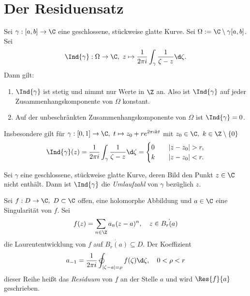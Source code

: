 \section{Der Residuensatz}\lecture
		
		\begin{thm}
			Sei $\gamma: [a,b] \to \C$ eine geschlossene, stückweise glatte Kurve. Sei $ \Omega := \C \setminus \gamma[a,b] $. Sei 
			$$ \Ind{\gamma}: \Omega \to \C,\ z \mapsto \frac{1}{2\pi i} \int_\gamma \frac{1}{\zeta- z}\d\zeta. $$
			Dann gilt:
			\begin{enumerate}[label={\alph*})]
				\item $\Ind{\gamma}$ ist stetig und nimmt nur Werte in $\Z$ an. Also ist $\Ind{\gamma}$ auf jeder Zusammenhangskomponente von $\Omega$ konstant.
				\item Auf der unbeschränkten Zusammenhangskomponente von $\Omega$ ist $\Ind{\gamma} = 0$.
			\end{enumerate}
		\end{thm}
		
		Insbesondere gilt für $ \gamma:[0,1] \to \C,\ t \mapsto z_0 + re^{2\pi ikt} $ mit $ z_0 \in \C,\ k \in \Z\setminus\{0\} $
		\[ \Ind{\gamma}(z) = \frac{1}{2\pi i} \int_\gamma \frac{1}{\zeta- z}\d\zeta = \begin{cases}
		0 \quad &|z-z_0| > r,\\
		k \quad &|z-z_0| < r.
		\end{cases} \]
			
		\begin{defn}[Umlaufzahl]
			Sei $\gamma$ eine geschlossene, stückweise glatte Kurve, deren Bild den Punkt $z \in \C$ nicht enthält. Dann ist $\Ind{\gamma}$ die \emph{Umlaufzahl} von $\gamma$ bezüglich $z$.
		\end{defn}
		
		\begin{defn}[Residuum]
			Sei $ f: D \to \C,\ D \subset \C $ offen, eine holomorphe Abbildung und $a \in \C$ eine Singularität von $f$. Sei 
			\[ f(z) = \sum_{n \in \Z} a_n(z-a)^n,\quad z \in \dot{B_r(a)} \]
			die Laurententwicklung von $f$ auf $ \dot{B_r(a)} \subseteq D $. Der Koeffizient
			\[ a_{-1} = \frac{1}{2\pi i} \varointctrclockwise_{|\zeta - a| = \rho} f(\zeta)\d\zeta, \quad 0 < \rho < r \]
			dieser Reihe heißt das \emph{Residuum} von $f$ an der Stelle $a$ und wird $\Res{f}{a}$ geschrieben.
		\end{defn}
		
